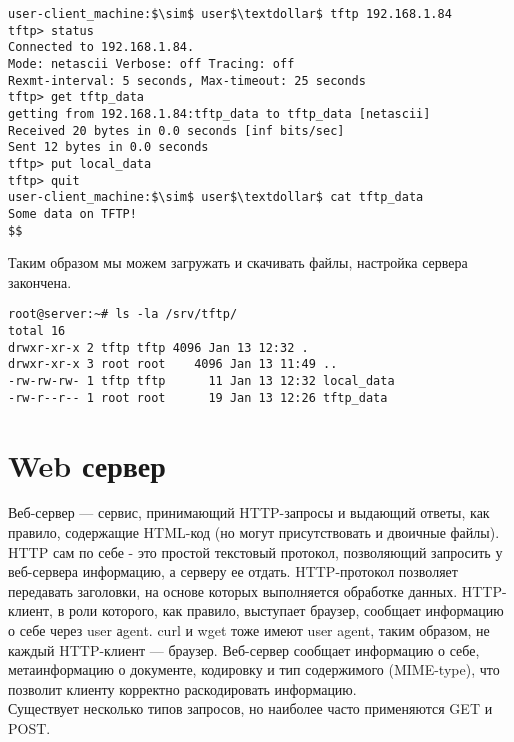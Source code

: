 \documentclass[14pt, a4paper]{article}
\begin{document}
\vspace{0.3cm}
\begin{lstlisting}
user-client_machine:$\sim$ user$\textdollar$ tftp 192.168.1.84
tftp> status
Connected to 192.168.1.84.
Mode: netascii Verbose: off Tracing: off
Rexmt-interval: 5 seconds, Max-timeout: 25 seconds
tftp> get tftp_data
getting from 192.168.1.84:tftp_data to tftp_data [netascii]
Received 20 bytes in 0.0 seconds [inf bits/sec]
Sent 12 bytes in 0.0 seconds
tftp> put local_data
tftp> quit
user-client_machine:$\sim$ user$\textdollar$ cat tftp_data
Some data on TFTP!
$$
\end{lstlisting}
\vspace{0.2cm}

Таким образом мы можем загружать и скачивать файлы, настройка сервера закончена.

\vspace{0.3cm}
\begin{lstlisting}
root@server:~# ls -la /srv/tftp/
total 16
drwxr-xr-x 2 tftp tftp 4096 Jan 13 12:32 .
drwxr-xr-x 3 root root    4096 Jan 13 11:49 ..
-rw-rw-rw- 1 tftp tftp      11 Jan 13 12:32 local_data
-rw-r--r-- 1 root root      19 Jan 13 12:26 tftp_data
\end{lstlisting}

\section*{Web сервер} 

Веб-сервер — сервис, принимающий HTTP-запросы и выдающий ответы, как правило, содержащие
HTML-код (но могут присутствовать и двоичные файлы).\\

HTTP сам по себе - это простой текстовый протокол, позволяющий запросить у веб-сервера
информацию, а серверу ее отдать. HTTP-протокол позволяет передавать заголовки, на основе
которых выполняется обработке данных. HTTP-клиент, в роли которого, как правило, выступает
браузер, сообщает информацию о себе через user аgent. curl и wget тоже имеют user agent, таким
образом, не каждый HTTP-клиент — браузер. Веб-сервер сообщает информацию о себе,
метаинформацию о документе, кодировку и тип содержимого (MIME-type), что позволит клиенту
корректно раскодировать информацию.\\

Существует несколько типов запросов, но наиболее часто применяются GET и POST.\\
\end{document}

